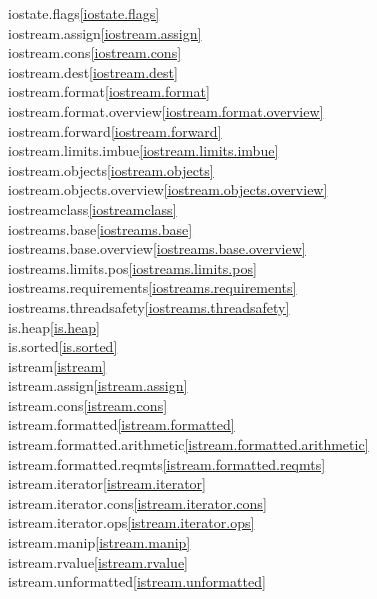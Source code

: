 \begin{multicols}{2}
iostate.flags\quad\ref{iostate.flags}\\
iostream.assign\quad\ref{iostream.assign}\\
iostream.cons\quad\ref{iostream.cons}\\
iostream.dest\quad\ref{iostream.dest}\\
iostream.format\quad\ref{iostream.format}\\
iostream.format.overview\quad\ref{iostream.format.overview}\\
iostream.forward\quad\ref{iostream.forward}\\
iostream.limits.imbue\quad\ref{iostream.limits.imbue}\\
iostream.objects\quad\ref{iostream.objects}\\
iostream.objects.overview\quad\ref{iostream.objects.overview}\\
iostreamclass\quad\ref{iostreamclass}\\
iostreams.base\quad\ref{iostreams.base}\\
iostreams.base.overview\quad\ref{iostreams.base.overview}\\
iostreams.limits.pos\quad\ref{iostreams.limits.pos}\\
iostreams.requirements\quad\ref{iostreams.requirements}\\
iostreams.threadsafety\quad\ref{iostreams.threadsafety}\\
is.heap\quad\ref{is.heap}\\
is.sorted\quad\ref{is.sorted}\\
istream\quad\ref{istream}\\
istream.assign\quad\ref{istream.assign}\\
istream.cons\quad\ref{istream.cons}\\
istream.formatted\quad\ref{istream.formatted}\\
istream.formatted.arithmetic\quad\ref{istream.formatted.arithmetic}\\
istream.formatted.reqmts\quad\ref{istream.formatted.reqmts}\\
istream.iterator\quad\ref{istream.iterator}\\
istream.iterator.cons\quad\ref{istream.iterator.cons}\\
istream.iterator.ops\quad\ref{istream.iterator.ops}\\
istream.manip\quad\ref{istream.manip}\\
istream.rvalue\quad\ref{istream.rvalue}\\
istream.unformatted\quad\ref{istream.unformatted}\\

\end{multicols}
